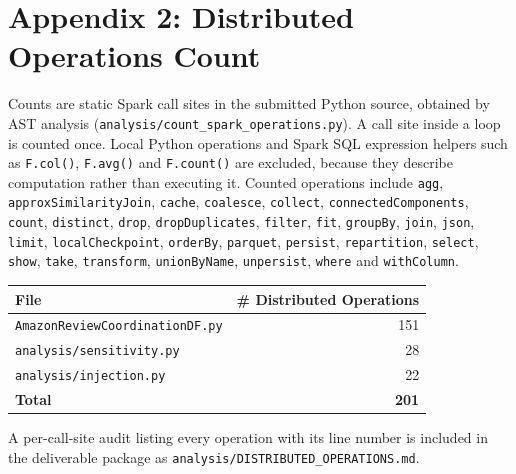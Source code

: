 \documentclass[12pt]{article}
\begin{document}
\section{Appendix 2: Distributed Operations Count}

Counts are static Spark call sites in the submitted Python source, obtained by
AST analysis (\texttt{analysis/count\_spark\_operations.py}). A call site
inside a loop is counted once. Local Python operations and Spark SQL
expression helpers such as \texttt{F.col()}, \texttt{F.avg()} and
\texttt{F.count()} are excluded, because they describe computation rather than
executing it. Counted operations include \texttt{agg},
\texttt{approxSimilarityJoin}, \texttt{cache}, \texttt{coalesce},
\texttt{collect}, \texttt{connectedComponents}, \texttt{count},
\texttt{distinct}, \texttt{drop}, \texttt{dropDuplicates}, \texttt{filter},
\texttt{fit}, \texttt{groupBy}, \texttt{join}, \texttt{json},
\texttt{limit}, \texttt{localCheckpoint}, \texttt{orderBy},
\texttt{parquet}, \texttt{persist}, \texttt{repartition}, \texttt{select},
\texttt{show}, \texttt{take}, \texttt{transform}, \texttt{unionByName},
\texttt{unpersist}, \texttt{where} and \texttt{withColumn}.

\begin{center}
\begin{tabular}{@{}lr@{}}
  \toprule
  \textbf{File} & \textbf{\# Distributed Operations} \\
  \midrule
  \texttt{AmazonReviewCoordinationDF.py} & 151 \\
  \texttt{analysis/sensitivity.py}       & 28 \\
  \texttt{analysis/injection.py}         & 22 \\
  \midrule
  \textbf{Total}                         & \textbf{201} \\
  \bottomrule
\end{tabular}
\end{center}

A per-call-site audit listing every operation with its line number is
included in the deliverable package as
\texttt{analysis/DISTRIBUTED\_OPERATIONS.md}.
\end{document}
